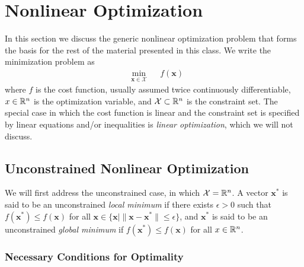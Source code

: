 \section{Nonlinear Optimization}

In this section we discuss the generic nonlinear optimization problem that forms the basis for the rest of the material presented in this class. We write the minimization problem as 
\begin{equation*}
\begin{aligned}
& \underset{\bm{x} \in \mathcal{X}}{\min}
& & f(\bm{x})
\end{aligned}
\end{equation*}
where $f$ is the cost function, usually assumed twice continuously differentiable, $x \in \mathbb{R}^n$ is the optimization variable, and $\mathcal{X} \subset \mathbb{R}^n$ is the constraint set. The special case in which the cost function is linear and the constraint set is specified by linear equations and/or inequalities is \textit{linear optimization}, which we will not discuss. 

\subsection{Unconstrained Nonlinear Optimization}

We will first address the unconstrained case, in which $\mathcal{X} = \mathbb{R}^n$. A vector $\bm{x}^*$ is said to be an unconstrained \textit{local minimum} if there exists $\epsilon > 0$ such that $f(\bm{x}^*) \leq f(\bm{x})$ for all $\bm{x} \in \{\bm{x} \mid \|\bm{x} - \bm{x}^*\| \leq \epsilon\}$, and $\bm{x}^*$ is said to be an unconstrained \textit{global minimum} if $f(\bm{x}^*) \leq f(\bm{x})$ for all $x \in \mathbb{R}^n$. 

\subsubsection{Necessary Conditions for Optimality}

